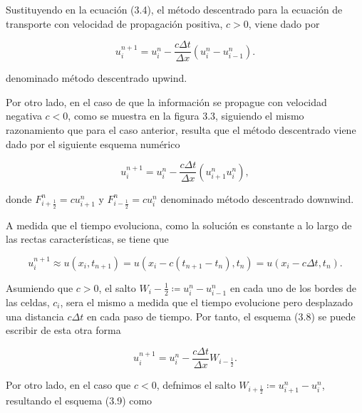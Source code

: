 Sustituyendo en la ecuación (3.4), el método descentrado para la ecuación de transporte
con velocidad de propagación positiva, $c>0$, viene dado por

\begin{equation*}
    u^{n+1}_{i}=
    u^{n}_{i}-
    \frac{c\Delta t}{\Delta x}
    \left(
    u^{n}_{i}-
    u^{n}_{i-1}
    \right).
\end{equation*}

denominado método descentrado upwind.

Por otro lado, en el caso de que la información se propague con velocidad negativa
$c<0$, como se muestra en la figura 3.3, siguiendo el mismo razonamiento que para el caso
anterior, resulta que el método descentrado viene dado por el siguiente esquema numérico


\begin{equation*}
    u^{n+1}_{i}=
    u^{n}_{i}-
    \frac{c\Delta t}{\Delta x}
    \left(
    u^{n}_{i+1}
    u^{n}_{i}
    \right),
\end{equation*}

donde $F^{n}_{i+\frac{1}{2}}=cu^{n}_{i+1}$ y $F^{n}_{i-\frac{1}{2}}=cu^{n}_{i}$
denominado método descentrado downwind.

A medida que el tiempo evoluciona, como la solución es constante a lo largo de las rectas
características, se tiene que

\begin{equation*}
    u^{n+1}_{i}\approx
    u
    \left(x_{i},t_{n+1}\right)=
    u
    \left(
    x_{i}-
    c\left(t_{n+1}-t_{n}\right),
    t_{n}
    \right)=
    u
    \left(
    x_{i}-
    c\Delta t,t_{n}
    \right).
\end{equation*}

Asumiendo que $c>0$, el salto
\begin{math}
    W_{i}-\frac{1}{2}\coloneqq
    u^{n}_{i}-
    u_{i-1}^{n}
\end{math}
en cada uno de los bordes de las celdas, $c_{i}$, sera el mismo a medida que el tiempo
evolucione pero desplazado una distancia $c\Delta t$ en cada paso de tiempo.
Por tanto, el esquema (3.8) se puede escribir de esta otra forma

\begin{equation*}
    u^{n+1}_{i}=
    u^{n}_{i}-
    \frac{c\Delta t}{\Delta x}
    W_{i-\frac{1}{2}}.
\end{equation*}

Por otro lado, en el caso que $c<0$, defnimos el salto
$W_{i+\frac{1}{2}}\coloneqq u^{n}_{i+1}-u^{n}_{i}$, resultando el esquema (3.9) como

